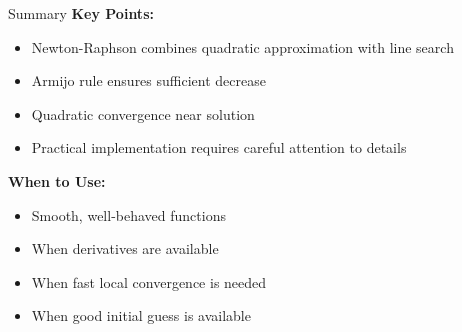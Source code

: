 \documentclass[10pt]{beamer}
\begin{document}
\begin{frame}[fragile]{Summary}
    \textbf{Key Points:}
    \begin{itemize}
        \item Newton-Raphson combines quadratic approximation with line search
        \item Armijo rule ensures sufficient decrease
        \item Quadratic convergence near solution
        \item Practical implementation requires careful attention to details
    \end{itemize}
    
    \textbf{When to Use:}
    \begin{itemize}
        \item Smooth, well-behaved functions
        \item When derivatives are available
        \item When fast local convergence is needed
        \item When good initial guess is available
    \end{itemize}
\end{frame}
\end{document}
